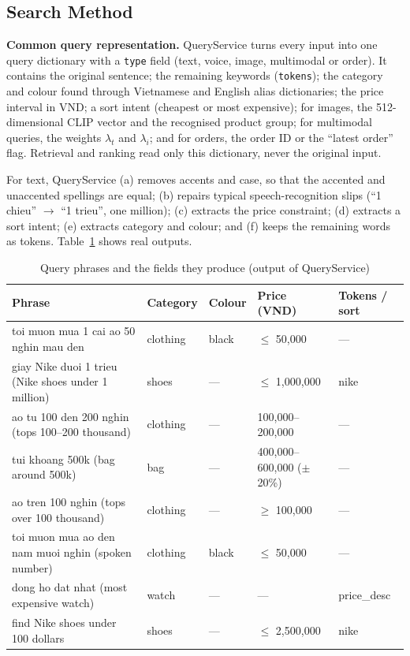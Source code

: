 \subsection{Search Method}
\label{subsec:searchmethod}
\textbf{Common query representation.} QueryService turns every input into one query dictionary with a \texttt{type} field (text, voice, image, multimodal or order). It contains the original sentence; the remaining keywords (\texttt{tokens}); the category and colour found through Vietnamese and English alias dictionaries; the price interval in VND; a sort intent (cheapest or most expensive); for images, the 512-dimensional CLIP vector and the recognised product group; for multimodal queries, the weights $\lambda_t$ and $\lambda_i$; and for orders, the order ID or the ``latest order'' flag. Retrieval and ranking read only this dictionary, never the original input.

For text, QueryService (a) removes accents and case, so that the accented and unaccented spellings are equal; (b) repairs typical speech-recognition slips (``1 chieu'' $\rightarrow$ ``1 trieu'', one million); (c) extracts the price constraint; (d) extracts a sort intent; (e) extracts category and colour; and (f) keeps the remaining words as tokens. Table~\ref{tab:queryparse} shows real outputs.

\begin{table}[H]
\centering
\small
\caption{Query phrases and the fields they produce (output of QueryService)}
\label{tab:queryparse}
\begin{tabular}{@{}p{5.6cm} l l p{3.0cm} l@{}}
\toprule
\textbf{Phrase} & \textbf{Category} & \textbf{Colour} & \textbf{Price (VND)} & \textbf{Tokens / sort} \\ \midrule
toi muon mua 1 cai ao 50 nghin mau den & clothing & black & $\le$ 50,000 & --- \\
giay Nike duoi 1 trieu (Nike shoes under 1 million) & shoes & --- & $\le$ 1,000,000 & nike \\
ao tu 100 den 200 nghin (tops 100--200 thousand) & clothing & --- & 100,000--200,000 & --- \\
tui khoang 500k (bag around 500k) & bag & --- & 400,000--600,000 ($\pm$20\%) & --- \\
ao tren 100 nghin (tops over 100 thousand) & clothing & --- & $\ge$ 100,000 & --- \\
toi muon mua ao den nam muoi nghin (spoken number) & clothing & black & $\le$ 50,000 & --- \\
dong ho dat nhat (most expensive watch) & watch & --- & --- & price\_desc \\
find Nike shoes under 100 dollars & shoes & --- & $\le$ 2,500,000 & nike \\ \bottomrule
\end{tabular}
\end{table}

